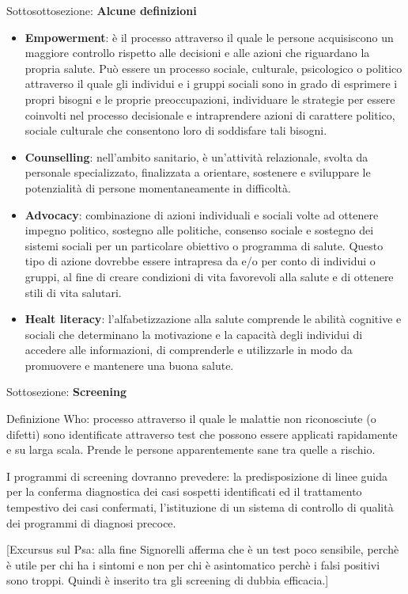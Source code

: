 \documentclass[]{article}
\begin{document}
Sottosottosezione: \textbf{Alcune definizioni}

\begin{itemize}
\item
  \textbf{Empowerment}: è il processo attraverso il quale le persone
  acquisiscono un maggiore controllo rispetto alle decisioni e alle
  azioni che riguardano la propria salute. Può essere un processo
  sociale, culturale, psicologico o politico attraverso il quale gli
  individui e i gruppi sociali sono in grado di esprimere i propri
  bisogni e le proprie preoccupazioni, individuare le strategie per
  essere coinvolti nel processo decisionale e intraprendere azioni di
  carattere politico, sociale culturale che consentono loro di
  soddisfare tali bisogni.
\item
  \textbf{Counselling}: nell'ambito sanitario, è un'attività
  relazionale, svolta da personale specializzato, finalizzata a
  orientare, sostenere e sviluppare le potenzialità di persone
  momentaneamente in difficoltà.
\item
  \textbf{Advocacy}: combinazione di azioni individuali e sociali volte
  ad ottenere impegno politico, sostegno alle politiche, consenso
  sociale e sostegno dei sistemi sociali per un particolare obiettivo o
  programma di salute. Questo tipo di azione dovrebbe essere intrapresa
  da e/o per conto di individui o gruppi, al fine di creare condizioni
  di vita favorevoli alla salute e di ottenere stili di vita salutari.
\item
  \textbf{Healt literacy}: l'alfabetizzazione alla salute comprende le
  abilità cognitive e sociali che determinano la motivazione e la
  capacità degli individui di accedere alle informazioni, di
  comprenderle e utilizzarle in modo da promuovere e mantenere una buona
  salute.
\end{itemize}

Sottosezione: \textbf{Screening}

Definizione Who: processo attraverso il quale le malattie non
riconosciute (o difetti) sono identificate attraverso test che possono
essere applicati rapidamente e su larga scala. Prende le persone
apparentemente sane tra quelle a rischio.

I programmi di screening dovranno prevedere: la predisposizione di linee
guida per la conferma diagnostica dei casi sospetti identificati ed il
trattamento tempestivo dei casi confermati, l'istituzione di un sistema
di controllo di qualità dei programmi di diagnosi precoce.

{[}Excursus sul Psa: alla fine Signorelli afferma che è un test poco
sensibile, perchè è utile per chi ha i sintomi e non per chi è
asintomatico perchè i falsi positivi sono troppi. Quindi è inserito tra
gli screening di dubbia efficacia.{]}
\end{document}

